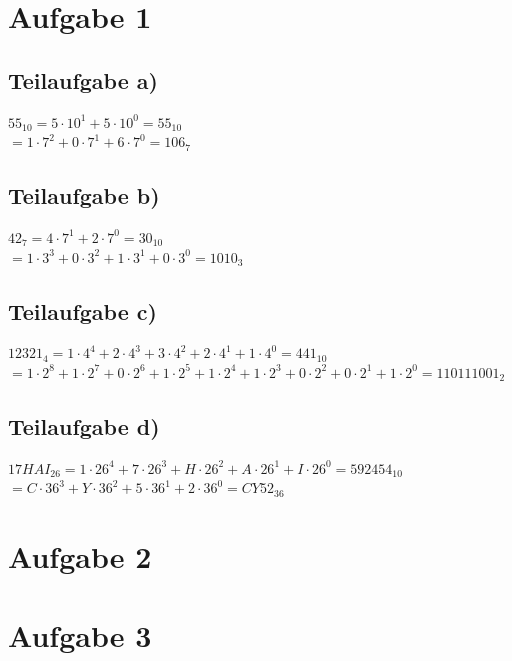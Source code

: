 \documentclass{llncs}
\begin{document}
\section*{Aufgabe 1}

\subsection*{Teilaufgabe a)}

$55_{10} = 5 \cdot 10^1 + 5 \cdot 10^0 = 55_{10}$\\
$= 1 \cdot 7^2 + 0 \cdot 7^1 + 6 \cdot 7^0 = 106_{7}$

\subsection*{Teilaufgabe b)}

$42_{7} = 4 \cdot 7^1 + 2 \cdot 7^0 = 30_{10}$\\
$= 1 \cdot 3^3 + 0 \cdot 3^2 + 1 \cdot 3^1 + 0 \cdot 3^0 = 1010_{3}$

\subsection*{Teilaufgabe c)}

$12321_{4} = 1 \cdot 4^4 + 2 \cdot 4^3 + 3 \cdot 4^2 + 2 \cdot 4^1 +1 \cdot 4^0 = 441_{10}$\\
$= 1 \cdot 2^8 + 1 \cdot 2^7 + 0 \cdot 2^6 + 1 \cdot 2^5 + 1 \cdot 2^4 + 1 \cdot 2^3 + 0 \cdot 2^2 + 0 \cdot 2^1 + 1 \cdot 2^0 = 110111001_{2}$

\subsection*{Teilaufgabe d)}

$17HAI_{26} = 1 \cdot 26^4 + 7 \cdot 26^3 + H \cdot 26^2 + A \cdot 26^1 + I \cdot 26^0 = 592454_{10}$\\
$= C \cdot 36^3 + Y \cdot 36^2 + 5 \cdot 36^1 + 2 \cdot 36^0 = CY52_{36}$

\section*{Aufgabe 2}

\newpage
\section*{Aufgabe 3}
\end{document}
